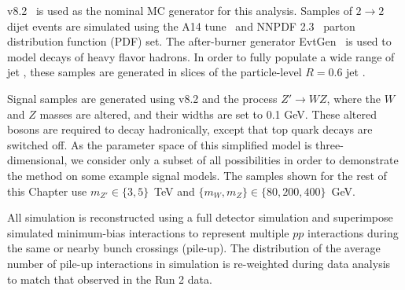 \PYTHIA{} v8.2~\cite{Sjostrand:2007gs,Sjostrand:2006za} is used as the nominal MC generator for this analysis.
Samples of $2\rightarrow 2$ dijet events are simulated using the A14 tune~\cite{ATL-PHYS-PUB-2014-021} and NNPDF 2.3~\cite{Ball:2012cx} parton distribution function (PDF) set.
The after-burner generator EvtGen~\cite{Lange:2001uf} is used to model decays of heavy flavor hadrons.
In order to fully populate a wide range of jet \pt, these samples are generated in slices of the particle-level $R=0.6$ jet \pt.

Signal samples are generated using \PYTHIA{} v8.2 and the process $Z'\rightarrow WZ$, where the $W$ and $Z$ masses are altered, and their widths are set to 0.1 GeV.
These altered bosons are required to decay hadronically, except that top quark decays are switched off.
As the parameter space of this simplified model is three-dimensional, we consider only a subset of all possibilities in order to demonstrate the method on some example signal models.
The samples shown for the rest of this Chapter use $m_{Z'}\in\{3,5\}$~TeV and $\{m_W,m_Z\}\in\{80,200,400\}$~GeV.

All simulation is reconstructed using a full detector simulation and superimpose simulated minimum-bias interactions to represent multiple $pp$ interactions during the same or nearby bunch crossings (pile-up).
The distribution of the average number of pile-up interactions in simulation is re-weighted during data analysis to match that observed in the Run 2 data.


\FloatBarrier
